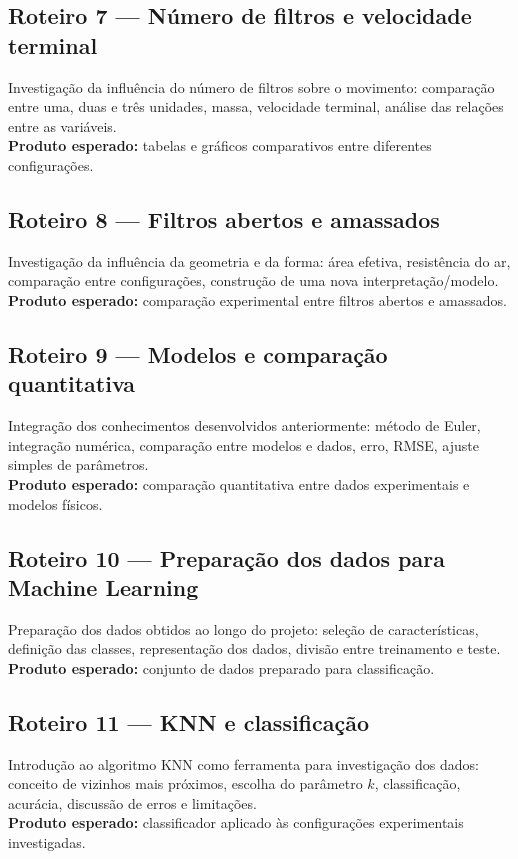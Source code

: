 \documentclass[11pt,a4paper]{article}
\begin{document}
\subsection*{Roteiro 7 --- Número de filtros e velocidade terminal}
Investigação da influência do número de filtros sobre o movimento: comparação entre uma, duas e três unidades, massa, velocidade terminal, análise das relações entre as variáveis.\\
\textbf{Produto esperado:} tabelas e gráficos comparativos entre diferentes configurações.

\subsection*{Roteiro 8 --- Filtros abertos e amassados}
Investigação da influência da geometria e da forma: área efetiva, resistência do ar, comparação entre configurações, construção de uma nova interpretação/modelo.\\
\textbf{Produto esperado:} comparação experimental entre filtros abertos e amassados.

\subsection*{Roteiro 9 --- Modelos e comparação quantitativa}
Integração dos conhecimentos desenvolvidos anteriormente: método de Euler, integração numérica, comparação entre modelos e dados, erro, RMSE, ajuste simples de parâmetros.\\
\textbf{Produto esperado:} comparação quantitativa entre dados experimentais e modelos físicos.

\subsection*{Roteiro 10 --- Preparação dos dados para Machine Learning}
Preparação dos dados obtidos ao longo do projeto: seleção de características, definição das classes, representação dos dados, divisão entre treinamento e teste.\\
\textbf{Produto esperado:} conjunto de dados preparado para classificação.

\subsection*{Roteiro 11 --- KNN e classificação}
Introdução ao algoritmo KNN como ferramenta para investigação dos dados: conceito de vizinhos mais próximos, escolha do parâmetro $k$, classificação, acurácia, discussão de erros e limitações.\\
\textbf{Produto esperado:} classificador aplicado às configurações experimentais investigadas.
\end{document}
